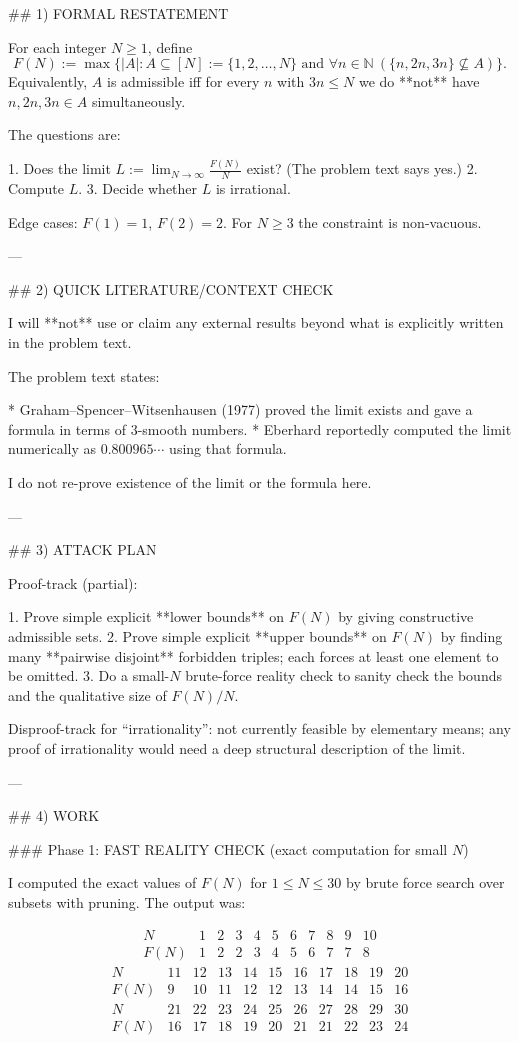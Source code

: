 ## 1) FORMAL RESTATEMENT

For each integer $N\ge 1$, define
\[
F(N):=\max\bigl\{|A|: A\subseteq [N]:=\{1,2,\dots,N\}\text{ and }\forall n\in\mathbb N\ (\{n,2n,3n\}\not\subseteq A)\bigr\}.
\]
Equivalently, $A$ is admissible iff for every $n$ with $3n\le N$ we do **not** have $n,2n,3n\in A$ simultaneously.

The questions are:

1. Does the limit $\displaystyle L:=\lim_{N\to\infty} \frac{F(N)}{N}$ exist? (The problem text says yes.)
2. Compute $L$.
3. Decide whether $L$ is irrational.

Edge cases: $F(1)=1$, $F(2)=2$. For $N\ge 3$ the constraint is non-vacuous.

---

## 2) QUICK LITERATURE/CONTEXT CHECK

I will **not** use or claim any external results beyond what is explicitly written in the problem text.

The problem text states:

* Graham–Spencer–Witsenhausen (1977) proved the limit exists and gave a formula in terms of $3$-smooth numbers.
* Eberhard reportedly computed the limit numerically as $0.800965\cdots$ using that formula.

I do not re-prove existence of the limit or the formula here.

---

## 3) ATTACK PLAN

Proof-track (partial):

1. Prove simple explicit **lower bounds** on $F(N)$ by giving constructive admissible sets.
2. Prove simple explicit **upper bounds** on $F(N)$ by finding many **pairwise disjoint** forbidden triples; each forces at least one element to be omitted.
3. Do a small-$N$ brute-force reality check to sanity check the bounds and the qualitative size of $F(N)/N$.

Disproof-track for “irrationality”: not currently feasible by elementary means; any proof of irrationality would need a deep structural description of the limit.

---

## 4) WORK

### Phase 1: FAST REALITY CHECK (exact computation for small $N$)

I computed the exact values of $F(N)$ for $1\le N\le 30$ by brute force search over subsets with pruning.
The output was:

\[
\begin{array}{c|cccccccccc}
N&1&2&3&4&5&6&7&8&9&10\\\hline
F(N)&1&2&2&3&4&5&6&7&7&8
\end{array}
\]
\[
\begin{array}{c|cccccccccc}
N&11&12&13&14&15&16&17&18&19&20\\\hline
F(N)&9&10&11&12&12&13&14&14&15&16
\end{array}
\]
\[
\begin{array}{c|cccccccccc}
N&21&22&23&24&25&26&27&28&29&30\\\hline
F(N)&16&17&18&19&20&21&21&22&23&24
\end{array}
\]

